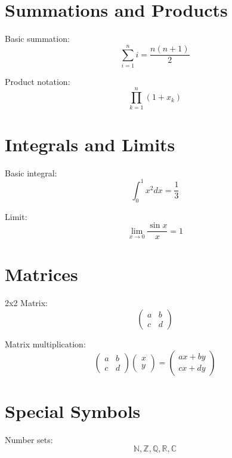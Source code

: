 \documentclass{article}
\begin{document}
\section{Summations and Products}
Basic summation:
\begin{equation}
\sum_{i=1}^{n} i = \frac{n(n+1)}{2}
\end{equation}

Product notation:
\begin{equation}
\prod_{k=1}^{n} (1 + x_k)
\end{equation}

\section{Integrals and Limits}
Basic integral:
\begin{equation}
\int_0^1 x^2 dx = \frac{1}{3}
\end{equation}

Limit:
\begin{equation}
\lim_{x \to 0} \frac{\sin x}{x} = 1
\end{equation}

\section{Matrices}
2x2 Matrix:
\begin{equation}
\begin{pmatrix}
a & b \\
c & d
\end{pmatrix}
\end{equation}

Matrix multiplication:
\begin{equation}
\begin{pmatrix}
a & b \\
c & d
\end{pmatrix}
\begin{pmatrix}
x \\
y
\end{pmatrix}
=
\begin{pmatrix}
ax + by \\
cx + dy
\end{pmatrix}
\end{equation}

\section{Special Symbols}
Number sets:
\begin{equation}
\mathbb{N}, \mathbb{Z}, \mathbb{Q}, \mathbb{R}, \mathbb{C}
\end{equation}
\end{document}
